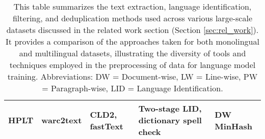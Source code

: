\begin{table}[htb]
{\begin{tabular}{lllll}
\multicolumn{1}{l}{HPLT \cite{degilbert_nail_etal2024}}                            
& \multicolumn{1}{l}{warc2text}                
& \multicolumn{1}{l}{CLD2, fastText}                   
& \multicolumn{1}{l}{Two-stage LID, dictionary spell check}            
& DW MinHash                                    \\ \hline
\end{tabular}%
}
\caption{\label{tab:datasets}%
This table summarizes the text extraction, language identification, filtering, and deduplication methods used across various large-scale datasets discussed in the related work section (Section \ref{sec:rel_work}). It provides a comparison of the approaches taken for both monolingual and multilingual datasets, illustrating the diversity of tools and techniques employed in the preprocessing of data for language model training. Abbreviations: DW = Document-wise, LW = Line-wise, PW = Paragraph-wise, LID = Language Identification.}

\end{table}
